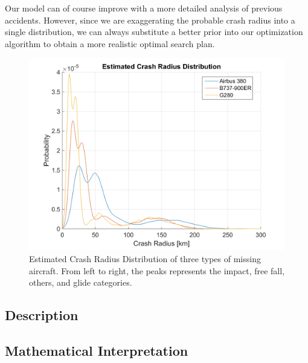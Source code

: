 \documentclass[12pt, letterpaper]{article}  %
\theoremstyle{definition}
\theoremstyle{remark}
\theoremstyle{plain}
\begin{document}
Our model can of course improve with a more detailed analysis of previous accidents. However, since we are exaggerating the probable crash radius into a single distribution, we can always substitute a better prior into our optimization algorithm to obtain a more realistic optimal search plan.

\begin{center}
	\begin{figure}[H]
		\centering
		\includegraphics[width=0.9\linewidth]{simulation/CrashRadiusExplain.png}
		\caption{Estimated Crash Radius Distribution of three types of missing aircraft. From left to right, the peaks represents the impact, free fall, others, and glide categories.}
		\label{fig:CrashRadius}
	\end{figure}
\end{center}


\subsection{Description}\label{subsecmeth:desc}



\subsection{Mathematical Interpretation}\label{subsecDist:math}
\end{document}
